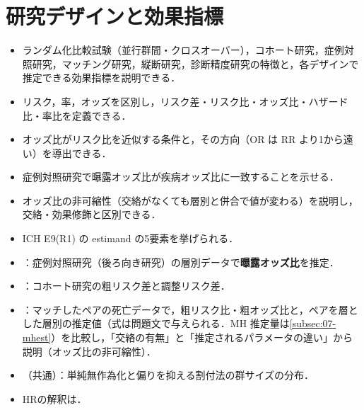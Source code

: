 \chapter{研究デザインと効果指標}\label{ch:02}

\begin{goalbox}
\begin{itemize}
\item ランダム化比較試験（並行群間・クロスオーバー），コホート研究，症例対照研究，マッチング研究，縦断研究，診断精度研究の特徴と，各デザインで推定できる効果指標を説明できる．
\item リスク，率，オッズを区別し，リスク差・リスク比・オッズ比・ハザード比・率比を定義できる．
\item オッズ比がリスク比を近似する条件と，その方向（OR は RR より1から遠い）を導出できる．
\item 症例対照研究で曝露オッズ比が疾病オッズ比に一致することを示せる．
\item オッズ比の非可縮性（交絡がなくても層別と併合で値が変わる）を説明し，交絡・効果修飾と区別できる．
\item ICH E9(R1) の estimand の5要素を挙げられる．
\end{itemize}
\end{goalbox}

\begin{exambox}
\begin{itemize}
\item {}：症例対照研究（後ろ向き研究）の層別データで\textbf{曝露オッズ比}を推定．
\item {}：コホート研究の粗リスク差と調整リスク差．
\item {}：マッチしたペアの死亡データで，粗リスク比・粗オッズ比と，ペアを層とした層別の推定値（式は問題文で与えられる．MH 推定量は\cref{subsec:07-mhest}）を比較し，「交絡の有無」と「推定されるパラメータの違い」から説明（オッズ比の非可縮性）．
\item {}（共通）：単純無作為化と偏りを抑える割付法の群サイズの分布．
\item HRの解釈は．
\end{itemize}
\end{exambox}

